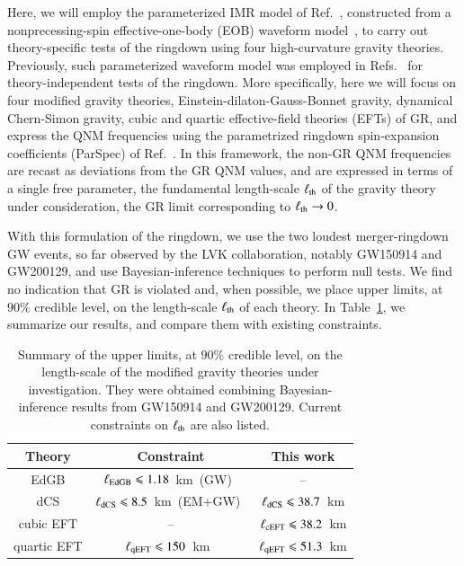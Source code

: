 \documentclass[twocolumn,
               prd,
               aps,
               superscriptaddress,
               tightenlines,
               nofootinbib,
               eqsecnum,
               amsfonts,
               amsmath,
               longbibliography]{revtex4-1}
\begin{document}
Here, we will employ the parameterized IMR model of Ref.~\cite{Ghosh:2021mrv}, constructed from a nonprecessing-spin effective-one-body (EOB) waveform model~\cite{Bohe:2016gbl,Cotesta:2018fcv,Mihaylov:2021bpf}, to carry out theory-specific tests of the
ringdown using four high-curvature gravity theories. Previously, such parameterized
waveform model was employed in Refs.~\cite{Abbott:2020jks,LIGOScientific:2021sio} for theory-independent tests of the ringdown.
%
More specifically, here we will focus on four modified gravity theories, Einstein-dilaton-Gauss-Bonnet gravity, dynamical
Chern-Simon gravity, cubic and quartic effective-field theories (EFTs) of GR, and
express the QNM frequencies using the parametrized ringdown spin-expansion coefficients (ParSpec)
of Ref.~\cite{Maselli:2019mjd}.
%
In this framework, the non-GR QNM frequencies are
recast as deviations from the GR QNM values, and are expressed in terms of a single free parameter,
the fundamental length-scale $\ell_{\rm th}$ of the gravity theory under consideration, the GR limit
corresponding to $\ell_{\rm th} \rightarrow 0$.

With this formulation of the ringdown, we use the two loudest merger-ringdown GW events, so far
observed by the LVK collaboration, notably GW150914 and GW200129, and use Bayesian-inference techniques to
perform null tests. We find no indication that GR is violated and, when possible, we place upper limits, at $90\%$ credible level,
on the length-scale $\ell_{\rm th}$ of each theory. In Table~\ref{tab:bound_summary}, we summarize our results, and compare
them with existing constraints.

\begin{table}[t]
\begin{tabular}{c | c c}
\hline \hline
Theory & Constraint & This work \\
\hline
EdGB        & $\ell_{\rm EdGB} \leqslant 1.18$~km~(GW)~\cite{Lyu:2022gdr} & -- \\
dCS         & $\ell_{\rm dCS} \leqslant 8.5$~km~(EM+GW)~\cite{Silva:2020acr}  & $\ell_{\rm dCS} \leqslant 38.7$~km \\
cubic EFT   & -- & $\ell_{\rm cEFT} \leqslant 38.2$~km \\
quartic EFT & $\ell_{\rm qEFT} \leqslant 150$~km~\cite{Sennett:2019bpc}  & $\ell_{\rm qEFT} \leqslant 51.3$~km \\
\hline \hline
\end{tabular}
\caption{Summary of the upper limits, at $90\%$ credible level,
on the length-scale of the modified gravity theories under investigation.
They were obtained combining Bayesian-inference results from GW150914 and GW200129.
Current constraints on $\ell_{\rm th}$ are also listed.}
\label{tab:bound_summary}
\end{table}
\end{document}
